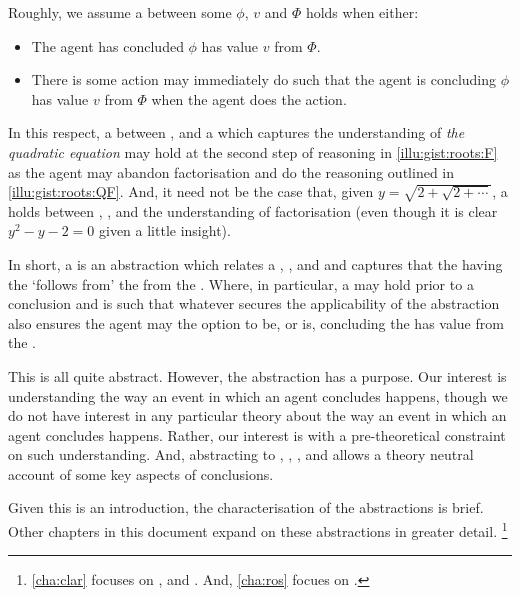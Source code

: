 \begin{note}
  \label{rosFirst}
  Roughly, we assume a \ros{} between some  \(\phi\),  \(v\) and  \(\Phi\) holds when either:
  \begin{itemize}
  \item
    The agent has concluded \(\phi\) has value \(v\) from \(\Phi\).
  \item
    There is some action may immediately do such that the agent is concluding \(\phi\) has value \(v\) from \(\Phi\) when the agent does the action.
  \end{itemize}
  In this respect, a \ros{} between \propM{\rootsCon{}},  and a \pool{} which captures the \agents{} understanding of \emph{the quadratic equation} may hold at the second step of reasoning in \autoref{illu:gist:roots:F} as the agent may abandon factorisation and do the reasoning outlined in \autoref{illu:gist:roots:QF}.
  And, it need not be the case that, given \(y = \sqrt{ 2 + \sqrt{2 + \cdots}}\), a \ros{} holds between , , and the \agents{} understanding of factorisation (even though it is clear \(y^{2} - y - 2 = 0\) given a little insight).
\end{note}


\begin{note}
  In short, a \ros{} is an abstraction which relates a , , and  and captures that the \prop{} having the \val{} `follows from' the \pool{} from the \agpe{}.
  Where, in particular, a \ros{} may hold prior to a conclusion and is such that whatever secures the applicability of the abstraction also ensures the agent may the option to be, or is, concluding the  has value  from the .

  This is all quite abstract.
  However, the abstraction has a purpose.
  Our interest is understanding the way an event in which an agent concludes happens, though we do not have interest in any particular theory about the way an event in which an agent concludes happens.
  Rather, our interest is with a pre-theoretical constraint on such understanding.
  And, abstracting to , , , and  allows a theory neutral account of some key aspects of conclusions.

  Given this is an introduction, the characterisation of the abstractions is brief.
  Other chapters in this document expand on these abstractions in greater detail.%
  \footnote{
    \autoref{cha:clar} focuses on ,  and .
    And, \autoref{cha:ros} focues on .
  }
\end{note}



